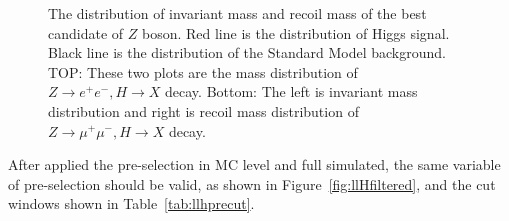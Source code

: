 \documentclass[11pt,a4paper]{cepcnote}
\begin{document}
\begin{figure}[H]
{		 \label{fig:uuHfilterRecMass}
	}
	\caption[]{The distribution of invariant mass and recoil mass of the best candidate of $Z$ boson. 
	Red line is the distribution of Higgs signal. Black line is the distribution of the Standard Model background.
	TOP: These two plots are the mass distribution of $Z\rightarrow e^+e^-, H\rightarrow X$ decay.
	Bottom: The left is invariant mass distribution and right is recoil mass distribution of $Z\rightarrow \mu^+\mu^-, H\rightarrow X$ decay.}
	\label{fig:llHfilter}
\end{figure}
	
	After applied the pre-selection in MC level and full simulated, the same variable of pre-selection should 
	be valid, as shown in Figure~\ref{fig:llHfiltered}, and the cut windows shown in Table~\ref{tab:llhprecut}.
\begin{figure}[H]
	\centering
\end{figure}
\end{document}
